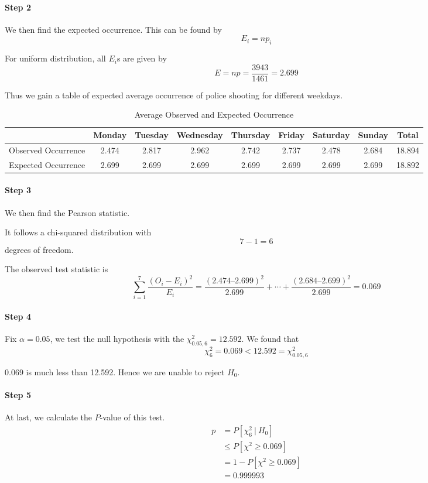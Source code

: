 \documentclass[a4paper]{article}
\begin{document}
\paragraph{Step 2} We then find the expected occurrence. This can be found by
$$E_i = np_i$$

For uniform distribution, all $E_i$s are given by
$$E=np=\frac{3943}{1461}=2.699$$

Thus we gain a table of expected average occurrence of police shooting for different weekdays.

\begin{table}[!htbp]
\centering
\begin{tabular}{c|ccccccc|c}
                    & Monday  & Tuesday & Wednesday & Thursday & Friday  & Saturday & Sunday  & Total \\ \hline
Observed Occurrence & 2.474     & 2.817     & 2.962       & 2.742      & 2.737     & 2.478      & 2.684     & 18.894  \\ \hline
Expected Occurrence & 2.699 & 2.699 & 2.699   & 2.699  & 2.699 & 2.699  & 2.699 & 18.892  \\
\end{tabular}
\caption{Average Observed and Expected Occurrence}
\end{table}

\paragraph{Step 3} We then find the Pearson statistic.

It follows a chi-squared distribution with $$7-1=6$$ degrees of freedom.

The observed test statistic is
\begin{equation}
\sum _ { i = 1 } ^ { 7 } \frac { \left( O _ { i } - E _ { i } \right) ^{ 2 } } { E _ { i } } = \frac { ( 2.474 – 2.699 ) ^ { 2 } } { 2.699 } + \cdots + \frac { ( 2.684 – 2.699 ) ^ { 2 } } { 2.699 } = 0.069
\end{equation}

\paragraph{Step 4}Fix $\alpha=0.05$, we test the null hypothesis with the $\chi^2_{0.05,6}=12.592$. We found that
$$\chi_{6}^2 = 0.069<12.592=\chi^2_{0.05,6}$$

0.069 is much less than 12.592. Hence we are unable to reject $H_0$.

\paragraph{Step 5} At last, we calculate the $P$-value of this test.
\begin{align*}
p &= P[\chi_{6}^2\ |\ H_0]\\
&\leq P[\chi^2\geq 0.069] \\
&= 1-P[\chi^2\geq 0.069]\\
&= 0.999993
\end{align*}
\end{document}
